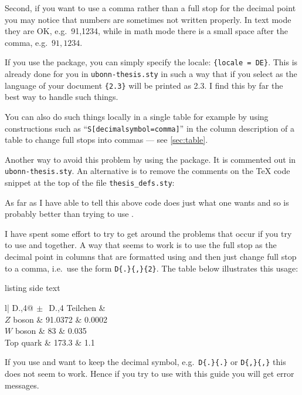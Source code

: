 Second, if you want to use a comma rather than a full stop for the
decimal point you may notice that numbers are sometimes not written
properly. In text mode they are OK, e.g.\ 91,1234, while in math mode
there is a small space after the comma, e.g.\ \(91,1234\).

If you use the  package, you can simply specify the
locale: \texttt{\{locale = DE\}}. This is already done
for you in \texttt{ubonn-thesis.sty} in such a way that if you
select  as the language of your document
\texttt{\{2.3\}} will be printed as \num[locale=DE]{2.3}. I find this
by far the best way to handle such things.

You can also do such things locally in a
single table for example by using constructions such as
\enquote{\texttt{S[decimalsymbol=comma]}} in the column description of a table to
change full stops into commas --- see \cref{sec:table}.

Another way to avoid this problem by using the  package. It is
commented out in \texttt{ubonn-thesis.sty}. An alternative
is to remove the comments on the \TeX{} code snippet at the top
of the file \texttt{thesis\_defs.sty}:
As far as I have able to tell this above code does just what one wants
and so is probably better than trying to use .

I have spent some effort to try to get around the problems that occur
if you try to use  and  together. A way
that seems to work is to use the full stop as the decimal point in
columns that are formatted using  and then just change
full stop to a comma, i.e.\ use the form \verb+D{.}{,}{2}+. The table
below illustrates this usage:
\begin{tcblisting}{listing side text}
\begin{otherlanguage}{ngerman}
\begin{tabular}{l|
  D{.}{,}{4}@{\(\,\pm\,\)}
  D{.}{,}{4}}
  Teilchen & \\
  \midrule
  \(Z\) boson & 91.0372 & 0.0002\\
  \(W\) boson & 83 & 0.035\\
  Top quark & 173.3 & 1.1\\
\end{tabular}
\end{otherlanguage}
\end{tcblisting}
If you use  and want to keep the decimal symbol,
e.g.\ \verb+D{.}{.}+ or \verb+D{,}{,}+ this does
not seem to work. Hence if you try to use  with this
guide you will get error messages.


